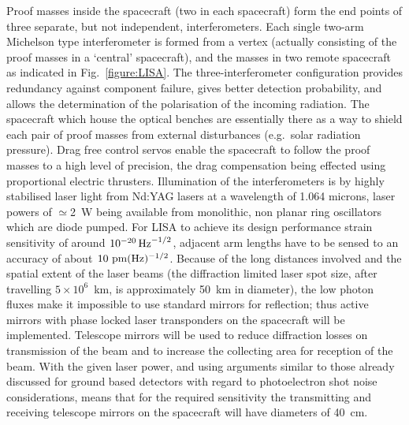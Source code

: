 \documentclass{article}
\begin{document}
Proof masses inside the spacecraft (two in each spacecraft) form the end points
of three separate, but not independent, interferometers. Each single two-arm
Michelson type interferometer is formed from a vertex (actually consisting of
the proof masses in a `central' spacecraft), and the masses in two remote
spacecraft as indicated in Fig.~\ref{figure:LISA}. The three-interferometer
configuration provides redundancy against component failure, gives better
detection probability, and allows the determination of the polarisation of the
incoming radiation. The spacecraft which house the optical benches are
essentially there as a way to shield each pair of proof masses from external
disturbances (e.g.~solar radiation pressure). Drag free control servos enable
the spacecraft to follow the proof masses to a high level of precision, the drag
compensation being effected using proportional electric thrusters. Illumination
of the interferometers is by highly stabilised laser light from Nd:YAG lasers at
a wavelength of 1.064 microns, laser powers of $\simeq$2~W being available from
monolithic, non planar ring oscillators which are diode pumped.  For LISA to
achieve its design performance strain sensitivity of around $10^{-20}\,{\rm
Hz}^{-1/2}$, adjacent arm lengths have to be sensed to an accuracy of about $10
{\rm \ pm}(\rm Hz)^{-1/2}$. Because of the long distances involved and the
spatial extent of the laser beams (the diffraction limited laser spot size,
after travelling $5\times10^{6}$~km, is approximately 50~km in diameter), the
low photon fluxes make it impossible to use standard mirrors for reflection;
thus active mirrors with phase locked laser transponders on the spacecraft will
be implemented. Telescope mirrors will be used to reduce diffraction losses on
transmission of the beam and to increase the collecting area for reception of
the beam. With the given laser power, and using arguments similar to those
already discussed for ground based detectors with regard to photoelectron shot
noise considerations, means that for the required sensitivity the transmitting
and receiving telescope mirrors on the spacecraft will have diameters of 40~cm.

\end{document}
